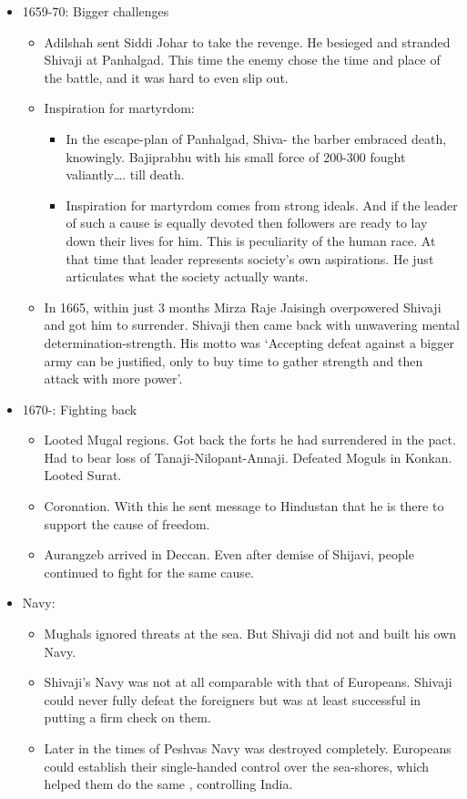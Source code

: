 \begin{itemize}
\item 1659-70: Bigger challenges
	\begin{itemize}
	\item Adilshah sent Siddi Johar to take the revenge. He besieged and stranded Shivaji at Panhalgad. This time the enemy chose the time and place of the battle, and it was hard to even slip out.
	\item Inspiration for martyrdom:
		\begin{itemize}
		\item In the escape-plan of Panhalgad, Shiva- the barber embraced death, knowingly.  Bajiprabhu with his small force of 200-300 fought valiantly…. till death.
		\item Inspiration for martyrdom comes from strong ideals. And if the leader of such a cause is equally devoted then followers are ready to lay down their lives for him. This is peculiarity of the human race. At that time that leader represents society’s own aspirations. He just articulates what the society actually wants.
		\end{itemize}
	\item In 1665, within just 3 months Mirza Raje Jaisingh overpowered Shivaji and got him to surrender. Shivaji then came back with unwavering mental determination-strength. His motto was ‘Accepting defeat against a bigger army can be justified, only to buy time to gather strength and then attack with more power’.
	\end{itemize}

\item 1670-:  Fighting back
	\begin{itemize}
	\item Looted Mugal regions. Got back the forts he had surrendered in the pact. Had to bear loss of Tanaji-Nilopant-Annaji. Defeated Moguls in Konkan. Looted Surat.
	\item Coronation. With this he sent message to Hindustan that he is there to support the cause of freedom.
	\item Aurangzeb arrived in Deccan. Even after demise of Shijavi, people continued to fight for the same cause.
	\end{itemize}

\item Navy:
	\begin{itemize}
	\item Mughals ignored threats at the sea. But Shivaji did not and built his own Navy.
	\item Shivaji’s Navy was not at all comparable with that of Europeans. Shivaji could never fully defeat the foreigners but was at least successful in putting a firm check on them.
	\item Later in the times of Peshvas Navy was destroyed completely. Europeans could establish their single-handed control over the sea-shores, which helped them do the same , controlling India.
	\end{itemize}


\end{itemize}
